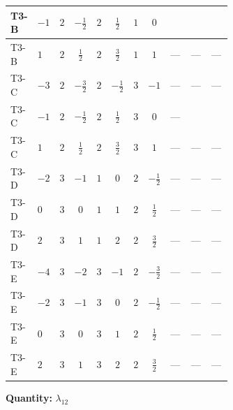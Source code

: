 \documentclass[8pt]{article}
\begin{document}
\begin{landscape}
\begin{longtable}{@{}llcccccc >{\raggedright\arraybackslash}p{0.21\linewidth} >{\raggedright\arraybackslash}p{0.21\linewidth} >{\raggedright\arraybackslash}p{0.21\linewidth}@{}}
T3-B & $-1$ & $2$ & $-\frac{1}{2}$ & $2$ & $\frac{1}{2}$ & $1$ & $0$ & \scriptsize\adjustbox{max width=\linewidth}{$\begin{gathered} {\lambda_{H H^\dagger S_1^\dagger S_2^\dagger}^{\rm Cross}} (T_{\nu}^{(1)}+T_{\nu}^{(2)}+6 \operatorname{Tr}\!\left({Y_d}\,\left({Y_d}\right)^{\dagger}\right)+2 \operatorname{Tr}\!\left({Y_e}\,\left({Y_e}\right)^{\dagger}\right)+6 \operatorname{Tr}\!\left({Y_u}\,\left({Y_u}\right)^{\dagger}\right))\end{gathered}$} & \scriptsize\adjustbox{max width=\linewidth}{$\begin{gathered} +6 {\lambda_{9}} \left({\lambda_{H H^\dagger S_1^\dagger S_2^\dagger}^{\rm Cross}}\right)^{*}\end{gathered}$} & \scriptsize\adjustbox{max width=\linewidth}{$\begin{gathered} -9 {g_2}^2 {\lambda_{H H^\dagger S_1^\dagger S_2^\dagger}^{\rm Cross}}\end{gathered}$} \\
\midrule
T3-B & $1$ & $2$ & $\frac{1}{2}$ & $2$ & $\frac{3}{2}$ & $1$ & $1$ & --- & --- & --- \\
\midrule
T3-C & $-3$ & $2$ & $-\frac{3}{2}$ & $2$ & $-\frac{1}{2}$ & $3$ & $-1$ & --- & --- & --- \\
\midrule
T3-C & $-1$ & $2$ & $-\frac{1}{2}$ & $2$ & $\frac{1}{2}$ & $3$ & $0$ & --- & \scriptsize\adjustbox{max width=\linewidth}{$\begin{gathered} +6 {\lambda_{9}} \left({\lambda_{H H^\dagger S_1^\dagger S_2^\dagger}^{\rm Cross}}\right)^{*}\end{gathered}$} & \scriptsize\adjustbox{max width=\linewidth}{$\begin{gathered} -9 {g_2}^2 {\lambda_{H H^\dagger S_1^\dagger S_2^\dagger}^{\rm Cross}}\end{gathered}$} \\
\midrule
T3-C & $1$ & $2$ & $\frac{1}{2}$ & $2$ & $\frac{3}{2}$ & $3$ & $1$ & --- & --- & --- \\
\midrule
T3-D & $-2$ & $3$ & $-1$ & $1$ & $0$ & $2$ & $-\frac{1}{2}$ & --- & --- & --- \\
\midrule
T3-D & $0$ & $3$ & $0$ & $1$ & $1$ & $2$ & $\frac{1}{2}$ & --- & --- & --- \\
\midrule
T3-D & $2$ & $3$ & $1$ & $1$ & $2$ & $2$ & $\frac{3}{2}$ & --- & --- & --- \\
\midrule
T3-E & $-4$ & $3$ & $-2$ & $3$ & $-1$ & $2$ & $-\frac{3}{2}$ & --- & --- & --- \\
\midrule
T3-E & $-2$ & $3$ & $-1$ & $3$ & $0$ & $2$ & $-\frac{1}{2}$ & --- & --- & --- \\
\midrule
T3-E & $0$ & $3$ & $0$ & $3$ & $1$ & $2$ & $\frac{1}{2}$ & --- & --- & --- \\
\midrule
T3-E & $2$ & $3$ & $1$ & $3$ & $2$ & $2$ & $\frac{3}{2}$ & --- & --- & --- \\
\midrule
\bottomrule
\end{longtable}
\clearpage
\noindent\textbf{Quantity: }$\lambda_{12}$\par\smallskip

\end{landscape}
\end{document}

